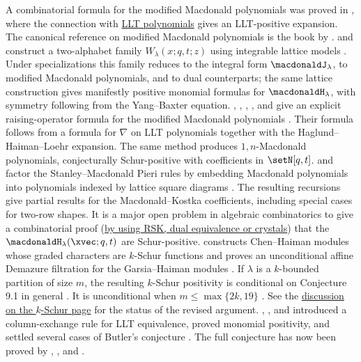 A combinatorial formula for the modified Macdonald polynomials was proved in
\cite{HaglundHaimanLoehr2005}, where the connection with
\hyperref[LLT]{LLT polynomials} gives an LLT-positive expansion.
The canonical reference on modified Macdonald polynomials is the book by
 \cite{qtCatalanBook}.
 and  construct a two-alphabet
family $W_\lambda(x;q,t;z)$ using integrable lattice models
\cite{GarbaliWheeler2020}.  Under specializations this family reduces to the
integral form $\macdonaldJ_\lambda$, to modified Macdonald polynomials, and
to dual counterparts; the same lattice construction gives manifestly positive
monomial formulas for $\macdonaldH_\lambda$, with symmetry following from
the Yang--Baxter equation.
, , ,
, and  give an explicit
raising-operator formula for the modified Macdonald polynomials
\cite{BlasiakHaimanMorsePunSeelinger2023xRaising}.  Their formula follows
from a formula for $\nabla$ on LLT polynomials together with the
Haglund--Haiman--Loehr expansion.  The same method produces
$1,n$-Macdonald polynomials, conjecturally Schur-positive with coefficients in
$\setN[q,t]$.
 and  factor the
Stanley--Macdonald Pieri rules by embedding Macdonald polynomials into
polynomials indexed by lattice square diagrams \cite{GarsiaHaiman1995Pieri}.
The resulting recursions give partial results for the Macdonald--Kostka
coefficients, including special cases for two-row shapes.
It is a major open problem in algebraic combinatorics to give a combinatorial
proof (\hyperref[schurPositivity]{by using RSK, dual equivalence or crystals})
that the $\macdonaldH_{\lambda}(\xvec;q,t)$ are Schur-positive.
 constructs Chen--Haiman modules whose graded characters are
$k$-Schur functions and proves an unconditional affine Demazure filtration
for the Garsia--Haiman modules \cite[Thm.~4.12 and Cor.~10.10]{Kato2025x}.
If $\lambda$ is a $k$-bounded partition of size $m$, the resulting
$k$-Schur positivity is conditional on Conjecture 9.1 in general
\cite[Cor.~10.11]{Kato2025x}.  It is unconditional when
$m\leq\max\{2k,19\}$ \cite[Thm.~10.1 and Cor.~10.12]{Kato2025x}.  See the
\hyperref[kSchurMacdonald]{discussion on the $k$-Schur page} for the status
of the revised argument.
, , and  introduced
a column-exchange rule for LLT equivalence, proved monomial positivity, and
settled several cases of Butler's conjecture
\cite{KimLeeOh2026}.  The full conjecture has now been proved by
, , and 
\cite{GuoKangXiong2026x}.

